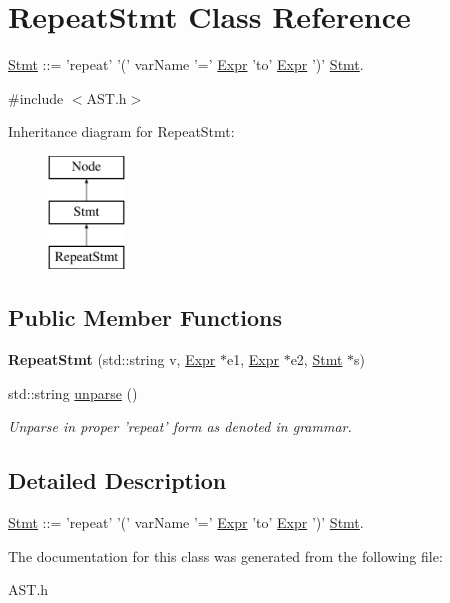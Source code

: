 \hypertarget{classRepeatStmt}{\section{Repeat\-Stmt Class Reference}
\label{classRepeatStmt}
}


\hyperlink{classStmt}{Stmt} \-:\-:= 'repeat' '(' var\-Name '=' \hyperlink{classExpr}{Expr} 'to' \hyperlink{classExpr}{Expr} ')' \hyperlink{classStmt}{Stmt}.  




{\ttfamily \#include $<$A\-S\-T.\-h$>$}

Inheritance diagram for Repeat\-Stmt\-:\begin{figure}[H]
\begin{center}
\leavevmode
\includegraphics[height=3.000000cm]{classRepeatStmt}
\end{center}
\end{figure}
\subsection*{Public Member Functions}
\begin{DoxyCompactItemize}
\item 
\hypertarget{classRepeatStmt_ad69bc210e4f21f15f34b68522d5aba8f}{{\bfseries Repeat\-Stmt} (std\-::string v, \hyperlink{classExpr}{Expr} $\ast$e1, \hyperlink{classExpr}{Expr} $\ast$e2, \hyperlink{classStmt}{Stmt} $\ast$s)}\label{classRepeatStmt_ad69bc210e4f21f15f34b68522d5aba8f}

\item 
\hypertarget{classRepeatStmt_a9ccc876694fd9b60671818bb9c81447e}{std\-::string \hyperlink{classRepeatStmt_a9ccc876694fd9b60671818bb9c81447e}{unparse} ()}\label{classRepeatStmt_a9ccc876694fd9b60671818bb9c81447e}

\begin{DoxyCompactList}\small\item\em Unparse in proper 'repeat' form as denoted in grammar. \end{DoxyCompactList}\end{DoxyCompactItemize}


\subsection{Detailed Description}
\hyperlink{classStmt}{Stmt} \-:\-:= 'repeat' '(' var\-Name '=' \hyperlink{classExpr}{Expr} 'to' \hyperlink{classExpr}{Expr} ')' \hyperlink{classStmt}{Stmt}. 

The documentation for this class was generated from the following file\-:\begin{DoxyCompactItemize}
\item 
A\-S\-T.\-h\end{DoxyCompactItemize}
